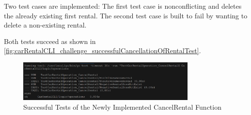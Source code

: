 Two test cases are implemented:
The first test case is nonconflicting and deletes the already existing first rental.
The second test case is built to fail by wanting to delete a non-existing rental.

Both tests succeed as shown in \autoref{fig:carRentalCLI_challenge_successfulCancellationOfRentalTest}.

\begin{figure}
    \centering
    \includegraphics[width=0.8\textwidth]{figures/goLang/carRental/carRentalCLI/challenge/carRentalCLI_challenge_successfulCancellationOfRentalTest.png}
    \caption{Successful Tests of the Newly Implemented CancelRental Function}
    \label{fig:carRentalCLI_challenge_successfulCancellationOfRentalTest}
\end{figure}
